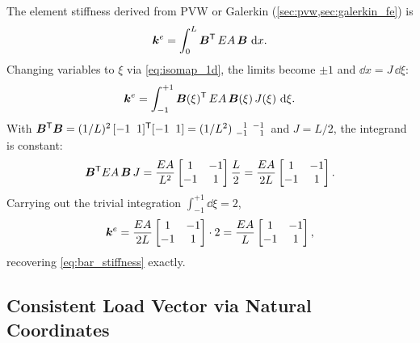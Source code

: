 The element stiffness derived from PVW or Galerkin (\cref{sec:pvw,sec:galerkin_fe}) is
\begin{equation}
    \bm{k}^e = \int_0^{L} \bm{B}^{\mathsf{T}}\, EA\, \bm{B} \,\,\mathrm{d} x.
\end{equation}
Changing variables to $\xi$ via \cref{eq:isomap_1d}, the limits become
$\pm 1$ and $\dd x = J\,\dd\xi$:
\begin{equation}
    \bm{k}^e = \int_{-1}^{+1} \bm{B}(\xi)^{\mathsf{T}}\,EA\,\bm{B}(\xi)
    \, J(\xi)\,\,\mathrm{d}\xi .
    \label{eq:ke_natural_1d}
\end{equation}
With $\bm{B}^{\mathsf{T}}\bm{B} = (1/L)^2\,[-1\;\;1]^{\mathsf{T}}[-1\;\;1]
= (1/L^2)\,\begin{smallmatrix}\phantom{-}1\;\;-1\\-1\;\;\phantom{-}1\end{smallmatrix}$
and $J = L/2$, the integrand is constant:
\begin{equation}
    \bm{B}^{\mathsf{T}} EA\,\bm{B}\,J
    = \frac{EA}{L^2}\begin{bmatrix} 1 & -1 \\ -1 & 1 \end{bmatrix}\frac{L}{2}
    = \frac{EA}{2L}\begin{bmatrix} 1 & -1 \\ -1 & 1 \end{bmatrix} .
\end{equation}
Carrying out the trivial integration $\int_{-1}^{+1}\dd\xi = 2$,
\begin{equation}
    \bm{k}^e = \frac{EA}{2L}\begin{bmatrix} 1 & -1 \\ -1 & 1 \end{bmatrix}
                \cdot 2
    = \frac{EA}{L}\begin{bmatrix} 1 & -1 \\ -1 & 1 \end{bmatrix} ,
\end{equation}
recovering \cref{eq:bar_stiffness} exactly.

\subsection{Consistent Load Vector via Natural Coordinates}

